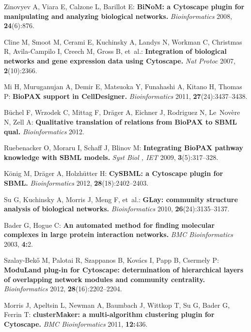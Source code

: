 \documentclass[11pt]{bmc_article_s50}
\begin{document}
\begin{thebibliography}{10}
Zinovyev A, Viara E, Calzone L, Barillot E: \textbf{BiNoM: a Cytoscape plugin
  for manipulating and analyzing biological networks.} \emph{Bioinformatics}
  2008, \textbf{24}(6):876.

Cline M, Smoot M, Cerami E, Kuchinsky A, Landys N, Workman C, Christmas R,
  Avila-Campilo I, Creech M, Gross B, et~al.: \textbf{Integration of biological
  networks and gene expression data using Cytoscape.} \emph{Nat Protoc}
  2007, \textbf{2}(10):2366.

Mi H, Muruganujan A, Demir E, Matsuoka Y, Funahashi A, Kitano H, Thomas P:
  \textbf{BioPAX support in CellDesigner.} \emph{Bioinformatics} 2011,
  \textbf{27}(24):3437--3438.

B{\"u}chel F, Wrzodek C, Mittag F, Dr{\"a}ger A, Eichner J, Rodriguez N,
  Le~Nov{\`e}re N, Zell A: \textbf{Qualitative translation of relations from
  BioPAX to SBML qual.} \emph{Bioinformatics} 2012.

Ruebenacker O, Moraru I, Schaff J, Blinov M: \textbf{Integrating BioPAX pathway
  knowledge with SBML models.} \emph{Syst Biol , IET} 2009,
  \textbf{3}(5):317--328.

K{\"o}nig M, Dr{\"a}ger A, Holzh{\"u}tter H: \textbf{CySBML: a Cytoscape plugin
  for SBML.} \emph{Bioinformatics} 2012, \textbf{28}(18):2402--2403.

Su G, Kuchinsky A, Morris J, Meng F, et~al.: \textbf{GLay: community structure
  analysis of biological networks.} \emph{Bioinformatics} 2010,
  \textbf{26}(24):3135--3137.

Bader G, Hogue C: \textbf{An automated method for finding molecular complexes
  in large protein interaction networks.} \emph{BMC Bioinformatics} 2003,
  \textbf{4:}2.

Szalay-Bek{\H{o}} M, Palotai R, Szappanos B, Kov{\'a}cs I, Papp B, Csermely P:
  \textbf{ModuLand plug-in for Cytoscape: determination of hierarchical layers
  of overlapping network modules and community centrality.}
  \emph{Bioinformatics} 2012, \textbf{28}(16):2202--2204.

Morris J, Apeltsin L, Newman A, Baumbach J, Wittkop T, Su G, Bader G, Ferrin T:
  \textbf{clusterMaker: a multi-algorithm clustering plugin for Cytoscape.}
  \emph{BMC Bioinformatics} 2011, \textbf{12:}436.


\end{thebibliography}
\end{document}

